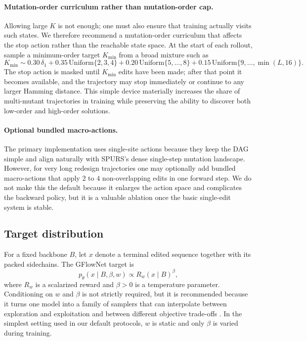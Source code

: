 \documentclass[11pt]{article}
\begin{document}
\paragraph{Mutation-order curriculum rather than mutation-order cap.}
Allowing large $K$ is not enough; one must also ensure that training actually visits such states. We therefore recommend a mutation-order curriculum that affects the stop action rather than the reachable state space. At the start of each rollout, sample a minimum-order target $K_{\min}$ from a broad mixture such as
\begin{equation}
    K_{\min}\sim 0.30\,\delta_{1}+0.35\,\mathrm{Uniform}\{2,3,4\}+0.20\,\mathrm{Uniform}\{5,\ldots,8\}+0.15\,\mathrm{Uniform}\{9,\ldots,\min(L,16)\}.
\end{equation}
The stop action is masked until $K_{\min}$ edits have been made; after that point it becomes available, and the trajectory may stop immediately or continue to any larger Hamming distance. This simple device materially increases the share of multi-mutant trajectories in training while preserving the ability to discover both low-order and high-order solutions.

\paragraph{Optional bundled macro-actions.}
The primary implementation uses single-site actions because they keep the DAG simple and align naturally with SPURS's dense single-step mutation landscape. However, for very long redesign trajectories one may optionally add bundled macro-actions that apply $2$ to $4$ non-overlapping edits in one forward step. We do not make this the default because it enlarges the action space and complicates the backward policy, but it is a valuable ablation once the basic single-edit system is stable.

\subsection{Target distribution}

For a fixed backbone $B$, let $x$ denote a terminal edited sequence together with its packed sidechains. The GFlowNet target is
\begin{equation}
\label{eq:targetdist}
    p_\theta(x\mid B,\beta,w) \propto R_w(x\mid B)^\beta,
\end{equation}
where $R_w$ is a scalarized reward and $\beta>0$ is a temperature parameter. Conditioning on $w$ and $\beta$ is not strictly required, but it is recommended because it turns one model into a family of samplers that can interpolate between exploration and exploitation and between different objective trade-offs \citep{kim2023lsl-gfn,jain2023mogfn}. In the simplest setting used in our default protocols, $w$ is static and only $\beta$ is varied during training.
\end{document}
